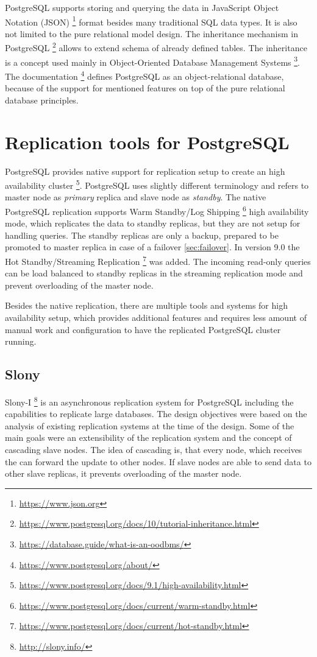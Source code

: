 \documentclass[
  digital, %
  twoside, %
  table,   %
  lof,     %
  lot,     %
]{fithesis3}
\begin{document}
PostgreSQL supports storing and querying the data in JavaScript Object Notation (JSON) \footnote{\url{https://www.json.org}} format besides many traditional SQL data types. It is also not limited to the pure relational model design. The inheritance mechanism in PostgreSQL \footnote{\url{https://www.postgresql.org/docs/10/tutorial-inheritance.html}} allows to extend schema of already defined tables. The inheritance is a concept used mainly in Object-Oriented Database Management Systems \footnote{\url{https://database.guide/what-is-an-oodbms/}}. The documentation \footnote{\url{https://www.postgresql.org/about/}} defines PostgreSQL as an object-relational database, because of the support for mentioned features on top of the pure relational database principles.

\section{Replication tools for PostgreSQL} \label{sec:pg_replication}
PostgreSQL provides native support for replication setup to create an high availability cluster \footnote{\url{https://www.postgresql.org/docs/9.1/high-availability.html}}. PostgreSQL uses slightly different terminology and refers to master node as \textit{primary} replica and slave node as \textit{standby}. The native PostgreSQL replication supports Warm Standby/Log Shipping \footnote{\url{https://www.postgresql.org/docs/current/warm-standby.html}} high availability mode, which replicates the data to standby replicas, but they are not setup for handling queries. The standby replicas are only a backup, prepared to be promoted to master replica in case of a failover \ref{sec:failover}. In version 9.0 the Hot Standby/Streaming Replication \footnote{\url{https://www.postgresql.org/docs/current/hot-standby.html}} was added. The incoming read-only queries can be load balanced to standby replicas in the streaming replication mode and prevent overloading of the master node.

Besides the native replication, there are multiple tools and systems for high availability setup, which provides additional features and requires less amount of manual work and configuration to have the replicated PostgreSQL cluster running.

\subsection{Slony}
Slony-I \footnote{\url{http://slony.info/}} is an asynchronous replication system for PostgreSQL including the capabilities to replicate large databases. The design objectives were based on the analysis of existing replication systems at the time of the design. Some of the main goals were an extensibility of the replication system and the concept of cascading slave nodes. The idea of cascading is, that every node, which receives the can forward the update to other nodes. If slave nodes are able to send data to other slave replicas, it prevents overloading of the master node.
\end{document}
